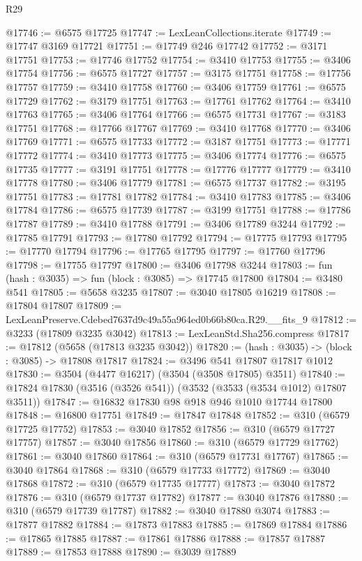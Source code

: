 \begin{lexlean}{R29}
\begin{coremodule}
@17746 := @6575 @17725
@17747 := LexLeanCollections.iterate
@17749 := @17747 @3169 @17721
@17751 := @17749 @246 @17742
@17752 := @3171 @17751
@17753 := @17746 @17752
@17754 := @3410 @17753
@17755 := @3406 @17754
@17756 := @6575 @17727
@17757 := @3175 @17751
@17758 := @17756 @17757
@17759 := @3410 @17758
@17760 := @3406 @17759
@17761 := @6575 @17729
@17762 := @3179 @17751
@17763 := @17761 @17762
@17764 := @3410 @17763
@17765 := @3406 @17764
@17766 := @6575 @17731
@17767 := @3183 @17751
@17768 := @17766 @17767
@17769 := @3410 @17768
@17770 := @3406 @17769
@17771 := @6575 @17733
@17772 := @3187 @17751
@17773 := @17771 @17772
@17774 := @3410 @17773
@17775 := @3406 @17774
@17776 := @6575 @17735
@17777 := @3191 @17751
@17778 := @17776 @17777
@17779 := @3410 @17778
@17780 := @3406 @17779
@17781 := @6575 @17737
@17782 := @3195 @17751
@17783 := @17781 @17782
@17784 := @3410 @17783
@17785 := @3406 @17784
@17786 := @6575 @17739
@17787 := @3199 @17751
@17788 := @17786 @17787
@17789 := @3410 @17788
@17791 := @3406 @17789 @3244
@17792 := @17785 @17791
@17793 := @17780 @17792
@17794 := @17775 @17793
@17795 := @17770 @17794
@17796 := @17765 @17795
@17797 := @17760 @17796
@17798 := @17755 @17797
@17800 := @3406 @17798 @3244
@17803 := fun (hash : @3035) => fun (block : @3085) => @17745 @17800
@17804 := @3480 @541
@17805 := @5658 @3235
@17807 := @3040 @17805 @16219
@17808 := @17804 @17807
@17809 := LexLeanPreserve.Cdebed7637d9c49a55a964ed0b66b80ca.R29.__fits_9
@17812 := @3233 (@17809 @3235 @3042)
@17813 := LexLeanStd.Sha256.compress
@17817 := @17812 (@5658 (@17813 @3235 @3042))
@17820 := (hash : @3035) -> (block : @3085) -> @17808 @17817
@17824 := @3496 @541 @17807 @17817 @1012
@17830 := @3504 (@4477 @16217) (@3504 (@3508 @17805) @3511)
@17840 := @17824 @17830 (@3516 (@3526 @541)) (@3532 (@3533 (@3534 @1012) @17807 @3511))
@17847 := @16832 @17830 @98 @918 @946 @1010 @17744 @17800
@17848 := @16800 @17751
@17849 := @17847 @17848
@17852 := @310 (@6579 @17725 @17752)
@17853 := @3040 @17852
@17856 := @310 (@6579 @17727 @17757)
@17857 := @3040 @17856
@17860 := @310 (@6579 @17729 @17762)
@17861 := @3040 @17860
@17864 := @310 (@6579 @17731 @17767)
@17865 := @3040 @17864
@17868 := @310 (@6579 @17733 @17772)
@17869 := @3040 @17868
@17872 := @310 (@6579 @17735 @17777)
@17873 := @3040 @17872
@17876 := @310 (@6579 @17737 @17782)
@17877 := @3040 @17876
@17880 := @310 (@6579 @17739 @17787)
@17882 := @3040 @17880 @3074
@17883 := @17877 @17882
@17884 := @17873 @17883
@17885 := @17869 @17884
@17886 := @17865 @17885
@17887 := @17861 @17886
@17888 := @17857 @17887
@17889 := @17853 @17888
@17890 := @3039 @17889

\end{coremodule}
\end{lexlean}
